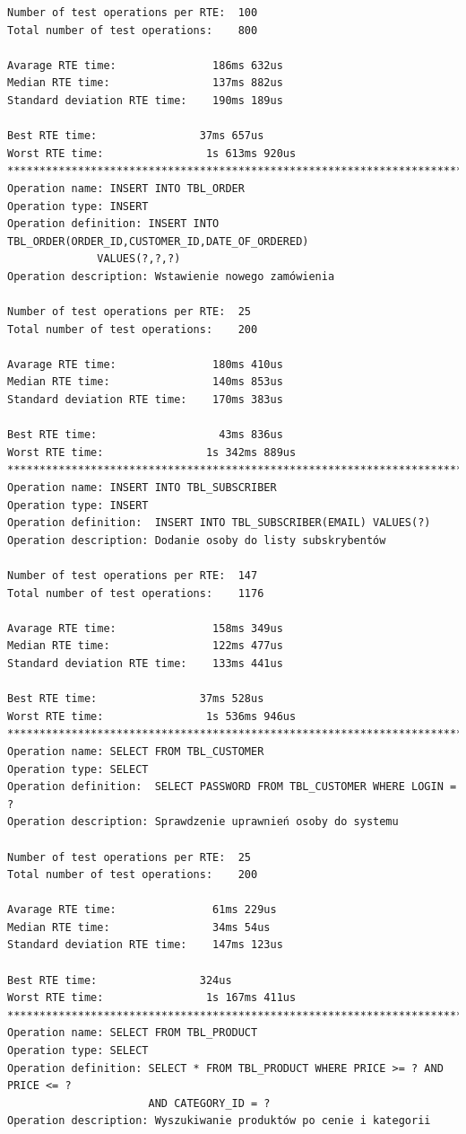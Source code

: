\begin{Verbatim}
Number of test operations per RTE:  100
Total number of test operations:    800

Avarage RTE time:               186ms 632us
Median RTE time:                137ms 882us
Standard deviation RTE time:    190ms 189us

Best RTE time:                37ms 657us
Worst RTE time:                1s 613ms 920us
*********************************************************************************
Operation name: INSERT INTO TBL_ORDER
Operation type: INSERT
Operation definition: INSERT INTO TBL_ORDER(ORDER_ID,CUSTOMER_ID,DATE_OF_ORDERED) 
		      VALUES(?,?,?)
Operation description: Wstawienie nowego zamówienia

Number of test operations per RTE:  25
Total number of test operations:    200

Avarage RTE time:               180ms 410us
Median RTE time:                140ms 853us
Standard deviation RTE time:    170ms 383us

Best RTE time:                   43ms 836us
Worst RTE time:                1s 342ms 889us
*********************************************************************************
Operation name: INSERT INTO TBL_SUBSCRIBER
Operation type: INSERT
Operation definition:  INSERT INTO TBL_SUBSCRIBER(EMAIL) VALUES(?)
Operation description: Dodanie osoby do listy subskrybentów

Number of test operations per RTE:  147
Total number of test operations:    1176

Avarage RTE time:               158ms 349us
Median RTE time:                122ms 477us
Standard deviation RTE time:    133ms 441us

Best RTE time:                37ms 528us
Worst RTE time:                1s 536ms 946us
*********************************************************************************
Operation name: SELECT FROM TBL_CUSTOMER
Operation type: SELECT
Operation definition:  SELECT PASSWORD FROM TBL_CUSTOMER WHERE LOGIN = ?
Operation description: Sprawdzenie uprawnień osoby do systemu

Number of test operations per RTE:  25
Total number of test operations:    200

Avarage RTE time:               61ms 229us
Median RTE time:                34ms 54us
Standard deviation RTE time:    147ms 123us

Best RTE time:                324us
Worst RTE time:                1s 167ms 411us
*********************************************************************************
Operation name: SELECT FROM TBL_PRODUCT
Operation type: SELECT
Operation definition: SELECT * FROM TBL_PRODUCT WHERE PRICE >= ? AND PRICE <= ? 
                      AND CATEGORY_ID = ?
Operation description: Wyszukiwanie produktów po cenie i kategorii


\end{Verbatim}
